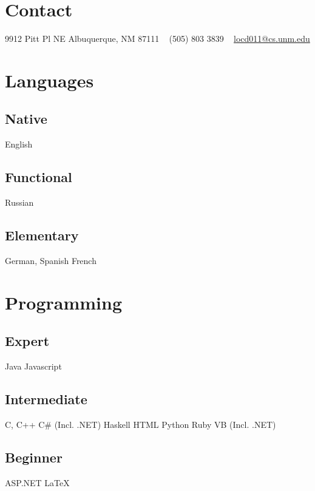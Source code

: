 \documentclass[]{friggeri-cv} %
\begin{document}


\begin{aside} %
\section{Contact}
9912 Pitt Pl NE
Albuquerque, NM 87111
~
(505) 803 3839
~
\href{mailto:locd011@gmail.com}{locd011@cs.unm.edu}
\section{Languages}
\subsection{Native}
English
\subsection{Functional}
Russian
\subsection{Elementary}
German, Spanish
French
\section{Programming}
\subsection{Expert}
Java
Javascript
\subsection{Intermediate}
C, C++
C\# (Incl. .NET)
Haskell
HTML
Python
Ruby
VB (Incl. .NET)
\subsection{Beginner}
ASP.NET
LaTeX
\end{aside}

\end{document}
